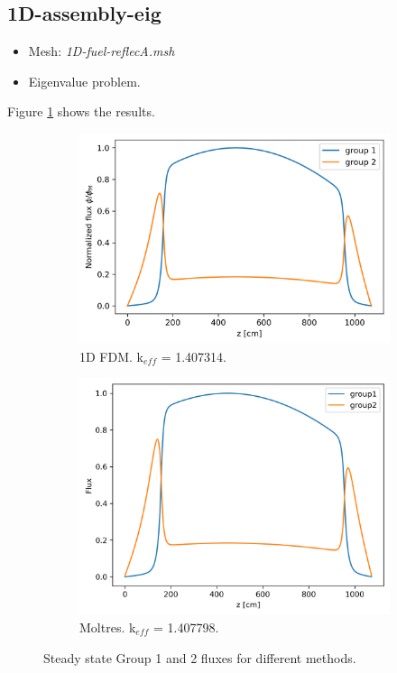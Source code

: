 \documentclass[11pt,letterpaper]{article}
\begin{document}
\subsection{1D-assembly-eig}

	\begin{itemize}
		\item Mesh: \textit{1D-fuel-reflecA.msh}
		\item Eigenvalue problem.
	\end{itemize}

Figure \ref{fig:1D-assembly-eig} shows the results.

	\begin{figure}[htbp!]
		\centering
		\begin{subfigure}[t]{0.4\textwidth}
			\centering
			\includegraphics[width=\linewidth]{1D-assembly-eig-FDM}
			\caption{1D FDM. k$_{eff}$ = 1.407314.}
		\end{subfigure}
		\begin{subfigure}[t]{0.4\textwidth}
			\centering
			\includegraphics[width=\linewidth]{1D-assembly}
			\caption{Moltres. k$_{eff}$ = 1.407798.}
		\end{subfigure}
		\hfill
		\caption{Steady state Group 1 and 2 fluxes for different methods.}
		\label{fig:1D-assembly-eig}
	\end{figure}

\pagebreak

% 
\end{document}
